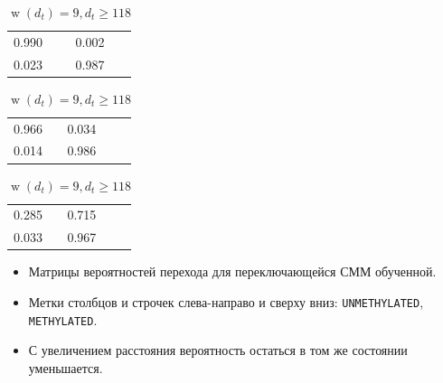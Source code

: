 \documentclass[unicode,mathserif]{beamer}
\begin{document}
\begin{frame}
  \begin{table}[ht]
    \centering
    \begin{subtable}[t]{.3\textwidth}
      \centering
      \begin{tabular}{ll}
        0.990 & 0.002 \\
        0.023 & 0.987
      \end{tabular}
      \caption{$\operatorname{w}(d_t) = 1, d_t \in [1, 2]$}
    \end{subtable}\hspace{.025\textwidth}%
    \begin{subtable}[t]{.3\textwidth}
      \centering
      \begin{tabular}{lll}
        0.966 & 0.034 \\
        0.014 & 0.986
      \end{tabular}
      \caption{$\operatorname{w}(d_t) = 5, d_t \in [6, 9]$}
    \end{subtable}\hspace{.025\textwidth}%
    \begin{subtable}[t]{.3\textwidth}
      \centering
      \begin{tabular}{lll}
        0.285 & 0.715 \\
        0.033 & 0.967
      \end{tabular}
      \caption{$\operatorname{w}(d_t) = 9, d_t \ge 118$}
    \end{subtable}
  \end{table}

  \begin{itemize}
  \item Матрицы вероятностей перехода для переключающейся СММ обученной.
  \item Метки столбцов и строчек слева-направо и сверху вниз: \texttt{UNMETHYLATED},
    \texttt{METHYLATED}.
  \item С увеличением расстояния вероятность остаться в том же состоянии
    уменьшается.
  \end{itemize}
\end{frame}
\end{document}
